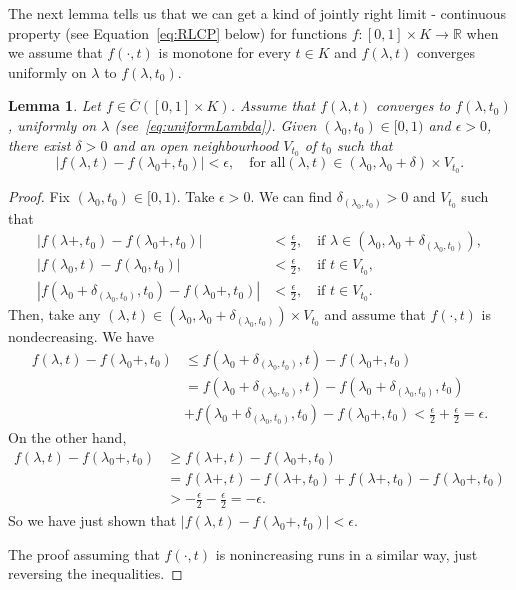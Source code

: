 \documentclass{amsart}
\newtheorem{lemma}[theorem]{Lemma}
\newcommand{\R}{{\mathbb{R}}}
\begin{document}
The next lemma tells us that we can get a kind of jointly right limit - continuous property (see Equation~\eqref{eq:RLCP} below) for functions $f:[0,1]\times K \rightarrow
\R$ when we assume that $f(\cdot,t)$ is monotone for every $t\in K$ and $f(\lambda,t)$  converges uniformly on $\lambda$  to $f(\lambda ,t_0)$.
\begin{lemma}\label{lem:jointRL}
Let $f\in \overline{C}([0,1]\times K)$.
Assume that $f(\lambda, t)$ converges to  $f(\lambda, t_0)$, uniformly on $\lambda$ (see~\eqref{eq:uniformLambda}).
Given $(\lambda_0,t_0)\in[0,1)$ and  $\epsilon>0$, there exist $\delta>0$ and an open neighbourhood $V_{t_0}$ of $t_0$ such that
\begin{equation}\label{eq:RLCP}
|f(\lambda,t)-f(\lambda_0+,t_0)|<\epsilon, \quad\text{for all
$(\lambda,t)\in (\lambda_0,\lambda_0+\delta)\times V_{t_0}$.}
\end{equation}
\end{lemma}
\begin{proof}
Fix $(\lambda_0,t_0)\in[0,1)$. Take $\epsilon>0$. We can find $\delta_{(\lambda_0,t_0)}>0$ and $V_{t_0}$ such that
\begin{align}
|f(\lambda+,t_0)-f(\lambda_0+,t_0)|&<\frac{\epsilon}{2},\quad \text{if $\lambda\in (\lambda_0,\lambda_0+\delta_{(\lambda_0,t_0)})$},\\
|f(\lambda_0,t)-f(\lambda_0,t_0)|&<\frac{\epsilon}{2},\quad \text{if $t\in V_{t_0}$},\\
|f(\lambda_0+\delta_{(\lambda_0,t_0)}, t_0)-f(\lambda_0+,t_0)|&<\frac{\epsilon}{2},\quad \text{if $t\in V_{t_0}$.}
\end{align}
Then, take any $(\lambda,t)\in (\lambda_0,\lambda_0+\delta_{(\lambda_0,t_0)})\times V_{t_0}$ and assume that $f(\cdot,t)$ is nondecreasing. We have
\begin{align*}
f(\lambda,t)-f(\lambda_0+,t_0)&\leq f(\lambda_0+\delta_{(\lambda_0,t_0)}, t)-f(\lambda_0+,t_0)\\
&=f(\lambda_0+\delta_{(\lambda_0,t_0)}, t)-f(\lambda_0+\delta_{(\lambda_0,t_0)},t_0)\\
&+f(\lambda_0+\delta_{(\lambda_0,t_0)}, t_0)-f(\lambda_0+,t_0)<\frac{\epsilon}{2}+\frac{\epsilon}{2}=\epsilon.
\end{align*}
On the other hand,
\begin{align*}
f(\lambda,t)-f(\lambda_0+,t_0)&\geq f(\lambda+, t)-f(\lambda_0+,t_0)\\
&=f(\lambda+, t)-f(\lambda+,t_0)+f(\lambda+, t_0)-f(\lambda_0+,t_0)\\
&>-\frac{\epsilon}{2}-\frac{\epsilon}{2}=-\epsilon.
\end{align*}
So we have just shown that $|f(\lambda,t)-f(\lambda_0+,t_0)|<\epsilon$.

The proof assuming that $f(\cdot,t)$ is nonincreasing runs in a similar way, just reversing the inequalities.

\end{proof}
\end{document}
